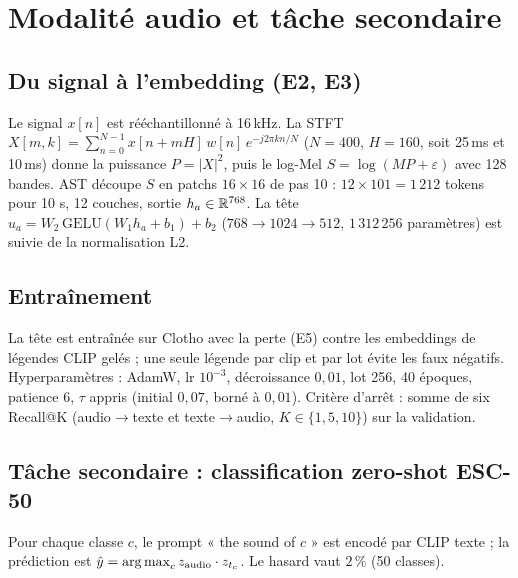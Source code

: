 \section{Modalité audio et tâche secondaire}\label{sec:audio}
\subsection{Du signal à l'embedding (E2, E3)}
Le signal $x[n]$ est rééchantillonné à 16\,kHz. La STFT $X[m,k]=\sum_{n=0}^{N-1}x[n+mH]\,w[n]\,e^{-j2\pi kn/N}$ ($N=400$,
$H=160$, soit 25\,ms et 10\,ms) donne la puissance $P=|X|^2$, puis le log-Mel $S=\log(M P+\varepsilon)$ avec 128 bandes.
AST \cite{gong2021ast} découpe $S$ en patchs $16\times16$ de pas 10 : $12\times101=1\,212$ tokens pour 10 s, 12 couches,
sortie $h_a\in\mathbb{R}^{768}$. La tête $u_a=W_2\,\mathrm{GELU}(W_1h_a+b_1)+b_2$ ($768\to1024\to512$, $1\,312\,256$ paramètres)
est suivie de la normalisation L2.

\subsection{Entraînement}
La tête est entraînée sur Clotho avec la perte (E5) contre les embeddings de légendes CLIP gelés ; une seule légende par clip
et par lot évite les faux négatifs. Hyperparamètres : AdamW, lr $10^{-3}$, décroissance $0{,}01$, lot 256, 40 époques,
patience 6, $\tau$ appris (initial $0{,}07$, borné à $0{,}01$). Critère d'arrêt : somme de six Recall@K (audio$\to$texte
et texte$\to$audio, $K\in\{1,5,10\}$) sur la validation.

\subsection{Tâche secondaire : classification zero-shot ESC-50}
Pour chaque classe $c$, le prompt « the sound of $c$ » est encodé par CLIP texte ; la prédiction est
$\hat y=\operatorname*{arg\,max}_c z_{\text{audio}}\cdot z_{t_c}$. Le hasard vaut $2\,\%$ (50 classes).
